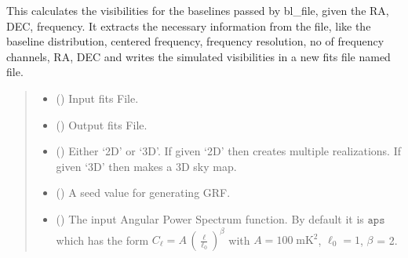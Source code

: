 \documentclass[a4paper,11pt,oneside,english,openany]{sphinxmanual}
\begin{document}
\begin{fulllineitems}
\label{\detokenize{simvis:simvis.sim_vis}}
\pysigstartsignatures
{}
\pysigstopsignatures
\sphinxAtStartPar
This calculates the visibilities for the baselines passed by bl\_file, given the RA, DEC, frequency. It extracts the necessary information from the  file, like the baseline distribution, centered frequency, frequency resolution, no of frequency channels, RA, DEC and writes the simulated visibilities in a new fits file named  file.
\begin{quote}\begin{description}
\begin{itemize}
\item {} 
\sphinxAtStartPar
{} () \textendash{} Input fits File.

\item {} 
\sphinxAtStartPar
{} () \textendash{} Output fits File.

\item {} 
\sphinxAtStartPar
{} () \textendash{} Either ‘2D’ or ‘3D’. If given ‘2D’ then creates multiple realizations. If given ‘3D’ then makes a 3D sky map.

\item {} 
\sphinxAtStartPar
{} () \textendash{} A seed value for generating GRF.

\item {} 
\sphinxAtStartPar
{} () \textendash{} The input Angular Power Spectrum function. By default it is \(\texttt{aps}\) which has the form \(C_{\ell}=A\, \left(\frac{\ell}{\ell_0}\right)^{\beta}\) with \(A = 100\;\text{mK}^2\), \(\ell_0=1\), \(\beta\) = \sphinxhyphen{}2.


\end{itemize}
\end{description}
\end{quote}
\end{fulllineitems}
\end{document}
